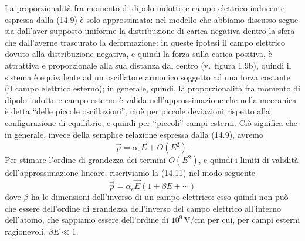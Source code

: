 La proporzionalit\`a fra momento di dipolo indotto e campo elettrico inducente
espressa dalla (14.9) \`e solo approssimata: nel modello che abbiamo discusso
segue sia dall'aver supposto uniforme la distribuzione di carica negativa dentro
la sfera che dall'averne trascurato la deformazione: in queste ipotesi il campo
elettrico dovuto alla distribuzione negativa, e quindi la forza sulla carica
positiva, \`e attrattiva e proporzionale alla sua distanza dal centro
(v.\ figura 1.9b), quindi il sistema \`e equivalente ad un oscillatore armonico
soggetto ad una forza costante (il campo elettrico esterno); in generale,
quindi, la proporzionalit\`a fra momento di dipolo indotto e campo esterno \`e
valida nell'approssimazione che nella meccanica \`e detta ``delle piccole
oscillazioni'', cio\`e per piccole deviazioni rispetto alla configurazione di
equilibrio, e quindi per ``piccoli'' campi esterni. Ci\`o significa che in
generale, invece della semplice relazione espressa dalla (14.9), avremo
\begin{equation}
  \vec p=\alpha_e\vec E+O(E^2).
  \tag{14.11}
\end{equation}
Per stimare l'ordine di grandezza dei termini $O(E^2)$, e quindi i limiti di
validit\`a dell'approssimazione lineare, riscriviamo la (14.11) nel modo
seguente
\begin{equation}
  \vec p=\alpha_e\vec E(1+\beta E+\cdots)
  \tag{14.12}
\end{equation}
dove $\beta$ ha le dimensioni dell'inverso di un campo elettrico: esso quindi
non pu\`o che essere dell'ordine di grandezza dell'inverso del campo elettrico
all'interno dell'atomo, che sappiamo essere dell'ordine di $10^9$\,V/cm per cui,
per campi esterni ragionevoli, $\beta E\ll1$.

